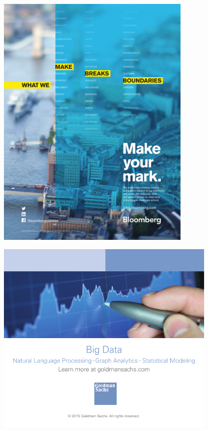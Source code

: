 \clearpage
\thispagestyle{empty}
\begin{center}
  \vfill
  \includegraphics[width=3.75in]{content/ads/platinum/Bloomberg.pdf}
  \vfill
\end{center}

\clearpage
\thispagestyle{empty}
\includegraphics[width=4.25in]{content/ads/gold/goldman_sachs.pdf}

